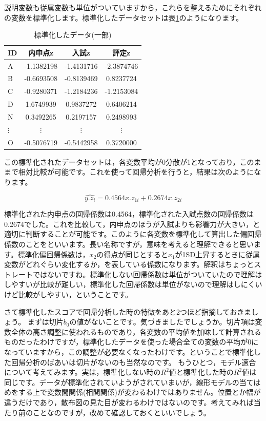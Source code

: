 \documentclass{ltjbook}
\begin{document}
説明変数も従属変数も単位がついていますから，これらを整えるためにそれぞれの変数を標準化します。標準化したデータセットは表\ref{tbl::10_03}のようになります。

\begin{table}
    \caption{標準化したデータ(一部)}
    \centering
    \begin{tabular}[t]{l|ccc}
    \hline
    ID & 内申点z & 入試z & 評定z\\
    \hline
    A & -1.1382198 & -1.4131716 & -2.3874746\\
    B & -0.6693508 & -0.8139469 & 0.8237724\\
    C & -0.9280371 & -1.2184236 & -1.2153084\\
    D & 1.6749939 & 0.9837272 & 0.6406214\\
    N & 0.3492265 & 0.2197157 & 0.2498993\\
    $\vdots$ & $\vdots$ & $\vdots$ & $\vdots$ \\
    O & -0.5076719 & -0.5442958 & 0.3720000\\
    \hline
    \end{tabular}
    \label{tbl::10_03}
    \end{table}

この標準化されたデータセットは，各変数平均が0分散が1となっており，このままで相対比較が可能です。これを使って回帰分析を行うと，結果は次のようになります。

\[ \hat{y.z_i} = 0.4564 x.z_{1i} + 0.2674 x.z_{2i} \]

標準化された内申点の回帰係数は0.4564，標準化された入試点数の回帰係数は0.2674でした。これを比較して，内申点のほうが入試よりも影響力が大きい，と適切に判断することが可能です。このように各変数を標準化して算出した偏回帰係数のことをといいます。長い名称ですが，意味を考えると理解できると思います。標準化偏回帰係数は，$x_2$の得点が同じとすると$x_1$が1SD上昇するときに従属変数がどれぐらい変化するか，を表している係数になります。解釈はちょっとストレートではないですね。標準化しない回帰係数は単位がついていたので理解はしやすいが比較が難しい，標準化した回帰係数は単位がないので理解はしにくいけど比較がしやすい，ということです。

さて標準化したスコアで回帰分析した時の特徴をあと2つほど指摘しておきましょう。
まずは切片$b_0$の値がないことです。気づきましたでしょうか。切片項は変数全体の高さ調整に使われるものであり，各変数の平均値を加味して計算されるものだったわけですが，標準化したデータを使った場合全ての変数の平均が0になっていますから，この調整が必要なくなったわけです。ということで標準化した回帰分析のばあいは切片がないのも当然なのです。
もうひとつ，モデル適合について考えてみます。実は，標準化しない時の$R^2$値と標準化した時の$R^2$値は同じです。データが標準化されていようがされていまいが，線形モデルの当てはめをする上で変数間関係(相関関係)が変わるわけではありません。位置とか幅が違うだけであり，散布図の見た目が変わるわけではないのです。考えてみれば当たり前のことなのですが，改めて確認しておくといいでしょう。
\end{document}
